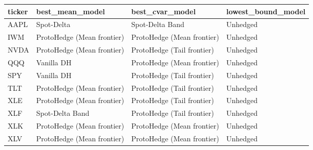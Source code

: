 \begin{tabular}{llll}
\toprule
ticker & best_mean_model & best_cvar_model & lowest_bound_model \\
\midrule
AAPL & Spot-Delta & Spot-Delta Band & Unhedged \\
IWM & ProtoHedge (Mean frontier) & ProtoHedge (Mean frontier) & Unhedged \\
NVDA & ProtoHedge (Mean frontier) & ProtoHedge (Tail frontier) & Unhedged \\
QQQ & Vanilla DH & ProtoHedge (Mean frontier) & Unhedged \\
SPY & Vanilla DH & ProtoHedge (Tail frontier) & Unhedged \\
TLT & ProtoHedge (Mean frontier) & ProtoHedge (Tail frontier) & Unhedged \\
XLE & ProtoHedge (Mean frontier) & ProtoHedge (Tail frontier) & Unhedged \\
XLF & Spot-Delta Band & ProtoHedge (Tail frontier) & Unhedged \\
XLK & ProtoHedge (Mean frontier) & ProtoHedge (Mean frontier) & Unhedged \\
XLV & ProtoHedge (Mean frontier) & ProtoHedge (Mean frontier) & Unhedged \\
\bottomrule
\end{tabular}
